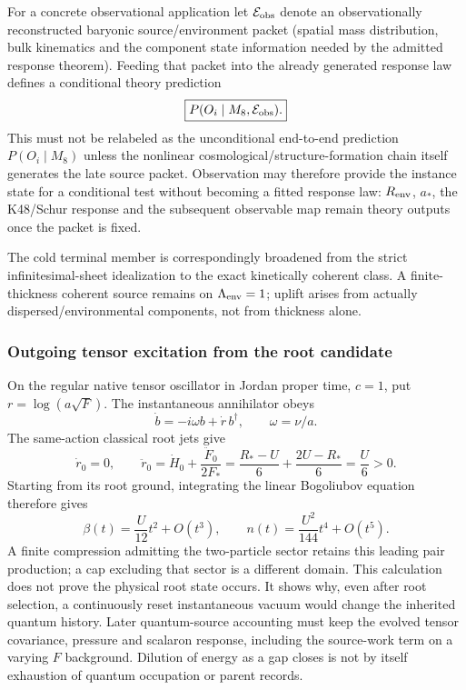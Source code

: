 \documentclass[12pt,a4paper]{article}
\begin{document}
For a concrete observational application let $\mathcal E_{\rm obs}$ denote an
observationally reconstructed baryonic source/environment packet (spatial
mass distribution, bulk kinematics and the component state information needed
by the admitted response theorem).  Feeding that packet into the already
generated response law defines a conditional theory prediction
\begin{equation}
 \boxed{P(O_i\mid M_8,\mathcal E_{\rm obs}).}
\label{p9:eq:v194-conditional-source-prediction}
\end{equation}
This must not be relabeled as the unconditional end-to-end prediction
$P(O_i\mid M_8)$ unless the nonlinear cosmological/structure-formation chain
itself generates the late source packet.  Observation may therefore provide
the instance state for a conditional test without becoming a fitted response
law: $R_{\rm env}$, $a_*$, the K48/Schur response and the subsequent observable
map remain theory outputs once the packet is fixed.

The cold terminal member is correspondingly broadened from the strict
infinitesimal-sheet idealization to the exact kinetically coherent class.  A
finite-thickness coherent source remains on $\Lambda_{\rm env}=1$; uplift
arises from actually dispersed/environmental components, not from thickness
alone.


\subsubsection{Outgoing tensor excitation from the root candidate}
\label{p9:app:v2109-outgoing-vacuum-check}
On the regular native tensor oscillator in Jordan proper time, \(c=1\),
put \(r=\log(a\sqrt F)\).  The instantaneous annihilator obeys
\[
 \dot b=-i\omega b+\dot r\,b^\dagger,\qquad \omega=\nu/a.
\]
The same-action classical root jets give
\[
 \dot r_0=0,\qquad
 \ddot r_0=\dot H_0+\frac{\ddot F_0}{2F_*}
 =\frac{R_*-U}{6}+\frac{2U-R_*}{6}=\frac U6>0.
\]
Starting from its root ground, integrating the linear Bogoliubov equation
therefore gives
\[
 \beta(t)=\frac{U}{12}t^2+O(t^3),\qquad
 n(t)=\frac{U^2}{144}t^4+O(t^5).
\]
A finite compression admitting the two-particle sector retains this leading
pair production; a cap excluding that sector is a different domain.
This calculation does not prove the physical root state occurs.  It shows
why, even after root selection, a continuously reset instantaneous vacuum
would change the inherited quantum history.  Later quantum-source
accounting must keep the evolved tensor covariance, pressure and scalaron
response, including the source-work term on a varying \(F\) background.
Dilution of energy as a gap closes is not by itself exhaustion of quantum
occupation or parent records.
\end{document}
